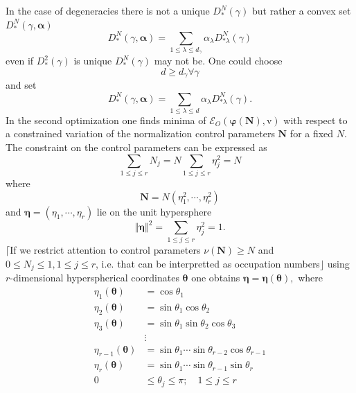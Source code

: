 \documentclass[aps,preprint]{revtex4}%
\begin{document}
In the case of degeneracies there is not a unique $D_{\ast}^{N}\left(
\gamma\right)  $ but rather a convex set $D_{\ast}^{N}\left(  \gamma
,\mathbf{\alpha}\right)  $
\begin{equation}
D_{\ast}^{N}\left(  \gamma,\mathbf{\alpha}\right)  =\sum_{1\leq\lambda\leq
d_{\gamma}}\alpha_{\lambda}D_{\ast\lambda}^{N}\left(  \gamma\right)
\end{equation}
even if $D_{\ast}^{2}\left(  \gamma\right)  $ is unique $D_{\ast}^{N}\left(
\gamma\right)  $ may not be. One could choose
\begin{equation}
d\geq d_{\gamma}\forall\gamma
\end{equation}
and set
\begin{equation}
D_{\ast}^{N}\left(  \gamma,\mathbf{\alpha}\right)  =\sum_{1\leq\lambda\leq
d}\alpha_{\lambda}D_{\ast\lambda}^{N}\left(  \gamma\right)  .
\end{equation}
In the second optimization one finds minima of $\mathcal{E}_{O}\left(
\boldsymbol{\varphi}\left(  \boldsymbol{N}\right)  \boldsymbol{,}%
\mathrm{v}\right)  $ with respect to a constrained variation of the
normalization control parameters $\boldsymbol{N}$ for a fixed $N$. The
constraint on the control parameters can be expressed as
\begin{equation}
\sum_{1\leq j\leq r}N_{j}=N\sum_{1\leq j\leq r}\eta_{j}^{2}=N
\end{equation}
where
\begin{equation}
\boldsymbol{N}=N\left(  \eta_{1}^{2},\cdots,\eta_{r}^{2}\right)
\end{equation}
and $\boldsymbol{\eta}=\left(  \eta_{1},\cdots,\eta_{r}\right)  $ lie on the
unit hypersphere
\begin{equation}
\left\Vert \boldsymbol{\eta}\right\Vert ^{2}=\sum_{1\leq j\leq r}\eta_{j}%
^{2}=1.
\end{equation}
$\lceil$If we restrict attention to control parameters $\nu\left(
\boldsymbol{N}\right)  \geq N$ and $0\leq N_{j}\leq1,1\leq j\leq r$, i.e. that
can be interpretted as occupation numbers$\rfloor$ using\ $r$-dimensional
hyperspherical coordinates $\boldsymbol{\theta}$ one obtains $\boldsymbol{\eta
=\eta}\left(  \boldsymbol{\theta}\right)  ,$ where
\begin{align}
\eta_{1}\left(  \boldsymbol{\theta}\right)   &  =\cos\theta_{1}\nonumber\\
\eta_{2}\left(  \boldsymbol{\theta}\right)   &  =\sin\theta_{1}\cos\theta
_{2}\nonumber\\
\eta_{3}\left(  \boldsymbol{\theta}\right)   &  =\sin\theta_{1}\sin\theta
_{2}\cos\theta_{3}\nonumber\\
&  \vdots\nonumber\\
\eta_{r-1}\left(  \boldsymbol{\theta}\right)   &  =\sin\theta_{1}\cdots
\sin\theta_{r-2}\cos\theta_{r-1}\nonumber\\
\eta_{r}\left(  \boldsymbol{\theta}\right)   &  =\sin\theta_{1}\cdots
\sin\theta_{r-1}\sin\theta_{r}\nonumber\\
0  &  \leq\theta_{j}\leq\pi;\quad1\leq j\leq r
\end{align}
\end{document}
